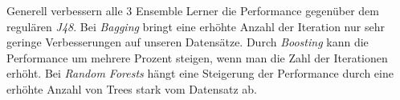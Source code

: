 Generell verbessern alle 3 Ensemble Lerner die Performance gegen\"uber dem regulären \emph{J48}. Bei \emph{Bagging} bringt eine erh\"ohte Anzahl der Iteration nur sehr geringe Verbesserungen auf unseren Datens\"atze. Durch \emph{Boosting} kann die Performance um mehrere Prozent steigen, wenn man die Zahl der Iterationen erh\"oht. Bei \emph{Random Forests} h\"angt eine Steigerung der Performance durch eine erh\"ohte Anzahl von Trees stark vom Datensatz ab. 
